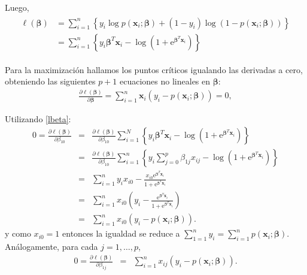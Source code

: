 \documentclass{report}
\def\dst{\displaystyle}
\begin{document}
Luego, 
\begin{eqnarray}\label{lbeta}
	\begin{aligned}
		\ell(\boldsymbol{\beta}) & =\sum_{i=1}^n\left\{y_i \log p\left(\mathbf{x}_i ; \boldsymbol{\beta}\right)+\left(1-y_i\right) \log \left(1-p\left(\mathbf{x}_i ; \boldsymbol{\beta}\right)\right)\right\} \\
		& =\sum_{i=1}^n\left\{y_i \boldsymbol{\beta}^T \mathbf{x}_i-\log \left(1+\text{e}^{\boldsymbol{\beta}^T \mathbf{x}_i}\right)\right\}
	\end{aligned}
\end{eqnarray}



 Para la maximización hallamos los puntos críticos igualando las derivadas a cero, obteniendo las siguientes $p+1$ ecuaciones no lineales en $\boldsymbol{\beta}$:
\begin{eqnarray}\label{4.21}
	\frac{\partial \ell(\boldsymbol{\beta})}{\partial \boldsymbol{\beta}}=\sum_{i=1}^n \mathbf{x}_i\left(y_i-p\left(\mathbf{x}_i ; \boldsymbol{\beta}\right)\right)=0,
\end{eqnarray}


 Utilizando \eqref{lbeta}:
\begin{eqnarray*}\label{lbeta0}
	0=\frac{\partial \ell(\boldsymbol{\beta})}{\partial \beta_{10}} 	&=& \frac{\partial \ell(\boldsymbol{\beta})}{\partial \beta_{10}} \sum_{i=1}^N\left\{y_i \boldsymbol{\beta}^T \mathbf{x}_i-\log \left(1+\text{e}^{\boldsymbol{\beta}^T \mathbf{x}_i}\right)\right\}\\
	&=& \frac{\partial \ell(\boldsymbol{\beta})}{\partial \beta_{10}} \sum_{i=1}^n\left\{y_i \sum_{j=0}^{p}\beta_{1j} x_{ij}-\log \left(1+\text{e}^{\boldsymbol{\beta}^T \mathbf{x}_i}\right)\right\}\\
	&=&  \sum_{i=1}^n y_i  x_{i0}- \frac{x_{i0}\text{e}^{\boldsymbol{\beta}^T \mathbf{x}_i}}{1+\text{e}^{\boldsymbol{\beta}^T \mathbf{x}_i}}\\
	&=&  \sum_{i=1}^n  x_{i0} \left( y_i - \frac{\text{e}^{\boldsymbol{\beta}^T \mathbf{x}_i}}{1+\text{e}^{\boldsymbol{\beta}^T \mathbf{x}_i}} \right)\\
	&=& \sum_{i=1}^n  x_{i0} \left( y_i - p\left(\mathbf{x}_i ; \boldsymbol{\beta}\right)  \right). 
\end{eqnarray*}
y como $x_{i0}=1$ entonces  la igualdad se reduce a $\dst \sum_{1=1}^n y_i=\sum_{i=1}^n p\left(\mathbf{x}_i ; \boldsymbol{\beta}\right)$.  Análogamente, para cada $j=1,\ldots, p$, 
\begin{eqnarray*}\label{lbetaj}
	0=\frac{\partial \ell(\boldsymbol{\beta})}{\partial \beta_{1j}} 	
	&=& \sum_{i=1}^n  x_{ij} \left( y_i - p\left(\mathbf{x}_i ; \boldsymbol{\beta}\right)  \right). 
\end{eqnarray*}
\end{document}
